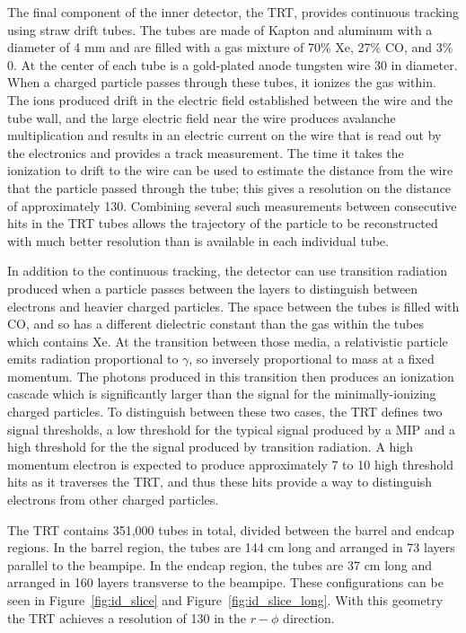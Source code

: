 The final component of the inner detector, the \ac{TRT}, provides continuous tracking using straw drift tubes.
The tubes are made of Kapton and aluminum with a diameter of 4 mm and are filled with a gas mixture of 70\% Xe, 27\% CO, and 3\% 0. 
At the center of each tube is a gold-plated anode tungsten wire 30 \um in diameter.
When a charged particle passes through these tubes, it ionizes the gas within.
The ions produced drift in the electric field established between the wire and the tube wall, and the large electric field near the wire produces avalanche multiplication and results in an electric current on the wire that is read out by the electronics and provides a track measurement.
The time it takes the ionization to drift to the wire can be used to estimate the distance from the wire that the particle passed through the tube; this gives a resolution on the distance of approximately 130\um.
Combining several such measurements between consecutive hits in the \ac{TRT} tubes allows the trajectory of the particle to be reconstructed with much better resolution than is available in each individual tube.

In addition to the continuous tracking, the detector can use transition radiation produced when a particle passes between the layers to distinguish between electrons and heavier charged particles.
The space between the tubes is filled with CO, and so has a different dielectric constant than the gas within the tubes which contains Xe.
At the transition between those media, a relativistic particle emits radiation proportional to $\gamma$, so inversely proportional to mass at a fixed momentum.
The photons produced in this transition then produces an ionization cascade which is significantly larger than the signal for the minimally-ionizing charged particles.
To distinguish between these two cases, the \ac{TRT} defines two signal thresholds, a low threshold for the typical signal produced by a \ac{MIP} and a high threshold for the the signal produced by transition radiation.
A high momentum electron is expected to produce approximately 7 to 10 high threshold hits as it traverses the \ac{TRT}, and thus these hits provide a way to distinguish electrons from other charged particles. 

The \ac{TRT} contains 351,000 tubes in total, divided between the barrel and endcap regions. 
In the barrel region, the tubes are 144 cm long and arranged in 73 layers parallel to the beampipe.
In the endcap region, the tubes are 37 cm long and arranged in 160 layers transverse to the beampipe.
These configurations can be seen in Figure~\ref{fig:id_slice} and Figure~\ref{fig:id_slice_long}. 
With this geometry the \ac{TRT} achieves a resolution of 130 \um  in the $r-\phi$ direction.

